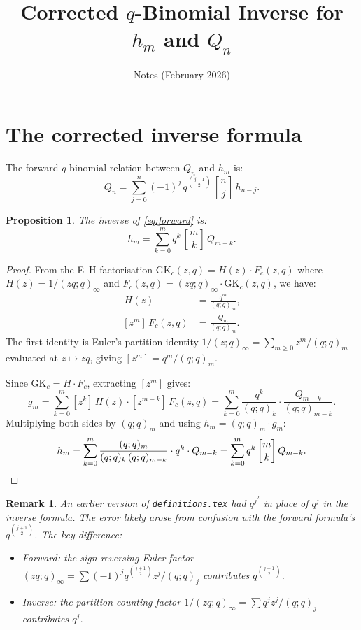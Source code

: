 \documentclass[11pt]{article}
\title{Corrected $q$-Binomial Inverse for $h_m$ and $Q_n$}
\author{Notes (February 2026)}
\date{}
\newtheorem{proposition}[theorem]{Proposition}
\newtheorem{remark}[theorem]{Remark}
\newcommand{\qpochn}[3]{(#1;#2)_{#3}}
\newcommand{\qbin}[2]{\genfrac{[}{]}{0pt}{}{#1}{#2}}
\begin{document}
\maketitle

\section{The corrected inverse formula}

The forward $q$-binomial relation between $Q_n$ and $h_m$ is:
\begin{equation}\label{eq:forward}
  Q_n = \sum_{j=0}^{n} (-1)^j\, q^{\binom{j+1}{2}}\,
    \qbin{n}{j}\, h_{n-j}.
\end{equation}

\begin{proposition}\label{prop:inverse}
The inverse of \eqref{eq:forward} is:
\begin{equation}\label{eq:inverse}
  h_m = \sum_{k=0}^{m} q^k\, \qbin{m}{k}\, Q_{m-k}.
\end{equation}
\end{proposition}

\begin{proof}
From the E--H factorisation $\mathrm{GK}_c(z,q) = H(z) \cdot F_c(z,q)$
where $H(z) = 1/\qpochn{zq}{q}{\infty}$ and
$F_c(z,q) = \qpochn{zq}{q}{\infty} \cdot \mathrm{GK}_c(z,q)$, we have:
\begin{align*}
  [z^m]\, H(z) &= \frac{q^m}{\qpochn{q}{q}{m}}, \\
  [z^m]\, F_c(z,q) &= \frac{Q_m}{\qpochn{q}{q}{m}}.
\end{align*}
The first identity is Euler's partition identity
$1/\qpochn{z}{q}{\infty} = \sum_{m \geq 0} z^m/\qpochn{q}{q}{m}$
evaluated at $z \mapsto zq$, giving $[z^m] = q^m/\qpochn{q}{q}{m}$.

Since $\mathrm{GK}_c = H \cdot F_c$, extracting $[z^m]$ gives:
\[
  g_m = \sum_{k=0}^{m} [z^k]\,H(z) \cdot [z^{m-k}]\,F_c(z,q)
  = \sum_{k=0}^{m} \frac{q^k}{\qpochn{q}{q}{k}} \cdot
    \frac{Q_{m-k}}{\qpochn{q}{q}{m-k}}.
\]
Multiplying both sides by $\qpochn{q}{q}{m}$ and using
$h_m = \qpochn{q}{q}{m} \cdot g_m$:
\[
  h_m = \sum_{k=0}^{m} \frac{\qpochn{q}{q}{m}}
    {\qpochn{q}{q}{k}\,\qpochn{q}{q}{m-k}}
    \cdot q^k \cdot Q_{m-k}
  = \sum_{k=0}^{m} q^k\, \qbin{m}{k}\, Q_{m-k}. \qedhere
\]
\end{proof}

\begin{remark}
An earlier version of \texttt{definitions.tex} had $q^{j^2}$ in place
of $q^j$ in the inverse formula.  The error likely arose from confusion
with the forward formula's $q^{\binom{j+1}{2}}$.  The key difference:
\begin{itemize}
  \item Forward: the sign-reversing Euler factor
    $\qpochn{zq}{q}{\infty} = \sum (-1)^j q^{\binom{j+1}{2}} z^j / \qpochn{q}{q}{j}$
    contributes $q^{\binom{j+1}{2}}$.
  \item Inverse: the partition-counting factor
    $1/\qpochn{zq}{q}{\infty} = \sum q^j z^j / \qpochn{q}{q}{j}$
    contributes $q^j$.
\end{itemize}
\end{remark}
\end{document}
